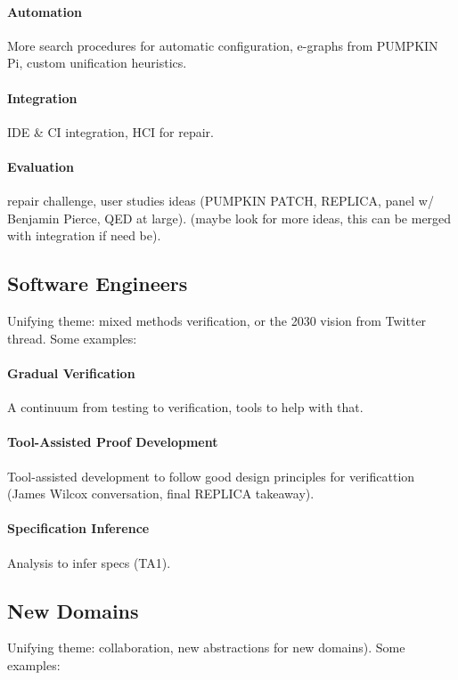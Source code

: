 \paragraph{Automation} More search procedures for automatic configuration, e-graphs from PUMPKIN Pi, custom unification heuristics.

\paragraph{Integration} IDE \& CI integration, HCI for repair.

\paragraph{Evaluation} repair challenge, user studies ideas (PUMPKIN PATCH, REPLICA, panel w/ Benjamin Pierce, QED at large). (maybe look for more ideas, this can be merged with integration if need be).

\subsection*{Software Engineers}

Unifying theme: mixed methods verification, or the 2030 vision from Twitter thread. Some examples:

\paragraph{Gradual Verification} A continuum from testing to verification, tools to help with that.

\paragraph{Tool-Assisted Proof Development} Tool-assisted development to follow good design principles for verificattion (James Wilcox conversation, final REPLICA takeaway).

\paragraph{Specification Inference} Analysis to infer specs (TA1).

\subsection*{New Domains}

Unifying theme: collaboration, new abstractions for new domains). Some examples:

